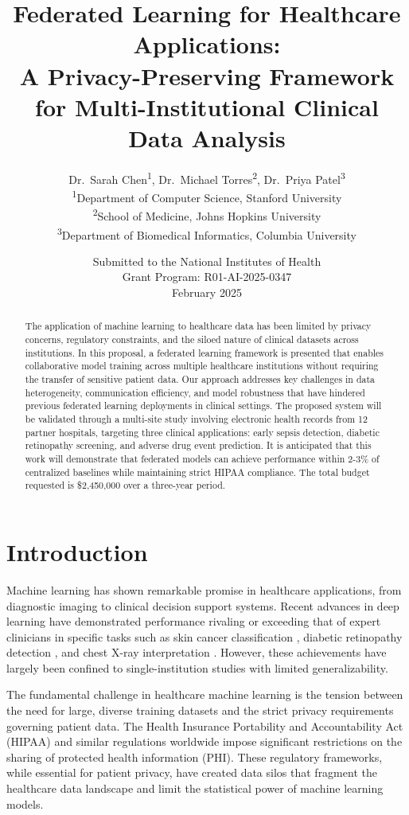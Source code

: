 \documentclass[12pt,letterpaper]{article}
\title{\textbf{Federated Learning for Healthcare Applications: \\
A Privacy-Preserving Framework for Multi-Institutional Clinical Data Analysis}}
\author{
  Dr.\ Sarah Chen\textsuperscript{1}, Dr.\ Michael Torres\textsuperscript{2}, Dr.\ Priya Patel\textsuperscript{3} \\[6pt]
  \textsuperscript{1}Department of Computer Science, Stanford University \\
  \textsuperscript{2}School of Medicine, Johns Hopkins University \\
  \textsuperscript{3}Department of Biomedical Informatics, Columbia University
}
\date{Submitted to the National Institutes of Health \\
Grant Program: R01-AI-2025-0347 \\
February 2025}
\begin{document}
\maketitle

\begin{abstract}
The application of machine learning to healthcare data has been limited by privacy concerns, regulatory constraints, and the siloed nature of clinical datasets across institutions. In this proposal, a federated learning framework is presented that enables collaborative model training across multiple healthcare institutions without requiring the transfer of sensitive patient data. Our approach addresses key challenges in data heterogeneity, communication efficiency, and model robustness that have hindered previous federated learning deployments in clinical settings. The proposed system will be validated through a multi-site study involving electronic health records from 12 partner hospitals, targeting three clinical applications: early sepsis detection, diabetic retinopathy screening, and adverse drug event prediction. It is anticipated that this work will demonstrate that federated models can achieve performance within 2-3\% of centralized baselines while maintaining strict HIPAA compliance. The total budget requested is \$2,450,000 over a three-year period.
\end{abstract}

\section{Introduction}
\label{sec:intro}

Machine learning has shown remarkable promise in healthcare applications, from diagnostic imaging to clinical decision support systems. Recent advances in deep learning have demonstrated performance rivaling or exceeding that of expert clinicians in specific tasks such as skin cancer classification \citep{Esteva2017}, diabetic retinopathy detection \citep{Gulshan2016}, and chest X-ray interpretation \citep{Rajpurkar2018}. However, these achievements have largely been confined to single-institution studies with limited generalizability.

The fundamental challenge in healthcare machine learning is the tension between the need for large, diverse training datasets and the strict privacy requirements governing patient data. The Health Insurance Portability and Accountability Act (HIPAA) and similar regulations worldwide impose significant restrictions on the sharing of protected health information (PHI). These regulatory frameworks, while essential for patient privacy, have created data silos that fragment the healthcare data landscape and limit the statistical power of machine learning models.
\end{document}
